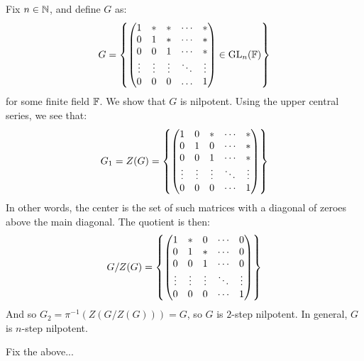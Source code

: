 \begin{xmp}[source=Primary Source Material]
    Fix $ n \in \mathbb{N} $, and define $ G $ as:
    \begin{equation*}
        G = \left\{{\begin{pmatrix}
                1 & * & * & \cdots & * \\
                0 & 1 & * & \cdots & * \\
                0 & 0 & 1 & \cdots & * \\
                \vdots & \vdots & \vdots & \ddots & \vdots \\
                0 & 0 & 0 & \dots & 1
        \end{pmatrix} \in \operatorname{GL}_{n}(\mathbb{F})}\right\}
    \end{equation*}
    for some finite field $ \mathbb{F} $.
    We show that $ G $ is nilpotent. \vsp
    Using the upper central series, we see that:
    \begin{equation*}
        G_{1} = Z(G) = \left\{{\begin{pmatrix}
                1 & 0 & * & \cdots & * \\
                0 & 1 & 0 & \cdots & * \\
                0 & 0 & 1 & \cdots & * \\
                \vdots & \vdots & \vdots & \ddots & \vdots \\
                0 & 0 & 0 & \cdots & 1
        \end{pmatrix}}\right\}
    \end{equation*}
    In other words, the center is the set of such matrices with a diagonal of zeroes above the
    main diagonal. The quotient is then:
    \begin{equation*}
        G/Z(G) = \left\{{\begin{pmatrix}
                1 & * & 0 & \cdots & 0 \\
                0 & 1 & * & \cdots & 0 \\
                0 & 0 & 1 & \cdots & 0 \\
                \vdots & \vdots & \vdots & \ddots & \vdots \\
                0 & 0 & 0 & \cdots & 1
        \end{pmatrix}}\right\}
    \end{equation*}
    And so $ G_{2} = \pi^{-1}(Z(G/Z(G))) = G $, so $ G $ is $ 2 $-step nilpotent.
    In general, $ G $ is $ n $-step nilpotent.
\end{xmp}

Fix the above...

